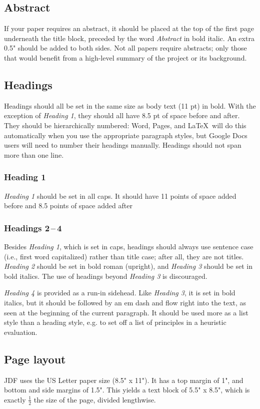\documentclass[
	letterpaper, %
]{jdf}
\begin{document}
\subsection{Abstract}
If your paper requires an abstract, it should be placed at the top of the first page underneath the title block, preceded by the word \emph{Abstract} in bold italic. An extra 0.5" should be added to both sides. Not all papers require abstracts; only those that would benefit from a high-level summary of the project or its background.

\subsection{Headings}
Headings should all be set in the same size as body text (11 pt) in bold. With the exception of \emph{Heading 1}, they should all have 8.5 pt of space before and after. They should be hierarchically numbered: Word, Pages, and \LaTeX\ will do this automatically when you use the appropriate paragraph styles, but Google Docs users will need to number their headings manually. Headings should not span more than one line.

\subsubsection{Heading 1}
\emph{Heading 1} should be set in all caps. It should have 11 points of space added before and 8.5 points of space added after

\subsubsection{Headings 2\,–\,4}
Besides \emph{Heading 1}, which is set in caps, headings should always use sentence case (i.e., first word capitalized) rather than title case; after all, they are not titles. \emph{Heading 2} should be set in bold roman (upright), and \emph{Heading 3} should be set in bold italics. The use of headings beyond \emph{Heading 3} is discouraged.

\emph{Heading 4} is provided as a run-in sidehead. Like \emph{Heading 3}, it is set in bold italics, but it should be followed by an em dash and flow right into the text, as seen at the beginning of the current paragraph. It should be used more as a list style than a heading style, e.g. to set off a list of principles in a heuristic evaluation.

\subsection{Page layout}
JDF uses the US Letter paper size (8.5" x 11"). It has a top margin of 1", and bottom and side margins of 1.5". This yields a text block of 5.5" x 8.5", which is exactly \(\frac{1}{2}\) the size of the page, divided lengthwise.
\end{document}
